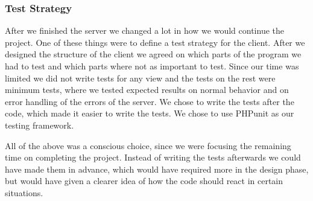 \subsubsection{Test Strategy}
After we finished the server we changed a lot in how we would continue the project.
One of these things were to define a test strategy for the client.
After we designed the structure of the client we agreed on which parts of the program we had to test and which parts where not as important to test.
Since our time was limited we did not write tests for any view and the tests on the rest were minimum tests, where we tested expected results on normal behavior and on error handling of the errors of the server.
We chose to write the tests after the code, which made it easier to write the tests. We chose to use PHPunit as our testing framework.

All of the above was a conscious choice, since we were focusing the remaining time on completing the project.
Instead of writing the tests afterwards we could have made them in advance, which would have required more in the design phase, but would have given a clearer idea of how the code should react in certain situations.

